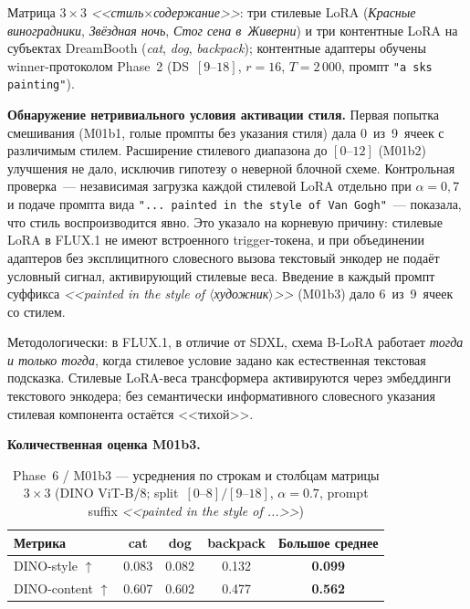 Матрица $3{\times}3$ \textit{<<стиль$\times$содержание>>}: три стилевые LoRA (\textit{Красные виноградники}, \textit{Звёздная ночь}, \textit{Стог сена в~Живерни}) и три контентные LoRA на субъектах DreamBooth (\textit{cat}, \textit{dog}, \textit{backpack}); контентные адаптеры обучены winner-протоколом Phase~2 (DS~$[9\text{--}18]$, $r{=}16$, $T{=}2\,000$, промпт \texttt{"a sks painting"}).

\textbf{Обнаружение нетривиального условия активации стиля.} Первая попытка смешивания (M01b1, голые промпты без указания стиля) дала 0~из~9~ячеек с различимым стилем. Расширение стилевого диапазона до $[0\text{--}12]$ (M01b2) улучшения не дало, исключив гипотезу о неверной блочной схеме. Контрольная проверка~--- независимая загрузка каждой стилевой LoRA отдельно при $\alpha{=}0{,}7$ и подаче промпта вида \texttt{"... painted in the style of Van Gogh"}~--- показала, что стиль воспроизводится явно. Это указало на корневую причину: стилевые LoRA в FLUX.1 не имеют встроенного trigger-токена, и при объединении адаптеров без эксплицитного словесного вызова текстовый энкодер не подаёт условный сигнал, активирующий стилевые веса. Введение в каждый промпт суффикса \textit{<<painted in the style of $\langle$художник$\rangle$>>} (M01b3) дало 6~из~9~ячеек со стилем.

Методологически: в FLUX.1, в отличие от SDXL, схема B-LoRA работает \emph{тогда и только тогда}, когда стилевое условие задано как естественная текстовая подсказка. Стилевые LoRA-веса трансформера активируются через эмбеддинги текстового энкодера; без семантически информативного словесного указания стилевая компонента остаётся <<тихой>>.

\textbf{Количественная оценка M01b3.}

\begin{table}[h]
\centering
\caption{Phase~6 / M01b3 --- усреднения по строкам и столбцам матрицы $3\times3$ (DINO ViT-B/8; split~$[0\text{–}8]/[9\text{–}18]$, $\alpha{=}0.7$, prompt suffix \textit{<<painted in the style of ...>>})}
\label{tab:phase6_summary}
\begingroup\small
\begin{tabular}{lcccc}
\hline
\textbf{Метрика}            & \textbf{cat}    & \textbf{dog}    & \textbf{backpack} & \textbf{Большое среднее} \\
\hline
DINO-style $\uparrow$       & 0.083           & 0.082           & 0.132              & \textbf{0.099}             \\
DINO-content $\uparrow$     & 0.607           & 0.602           & 0.477              & \textbf{0.562}             \\
\hline
\end{tabular}\endgroup
\end{table}

